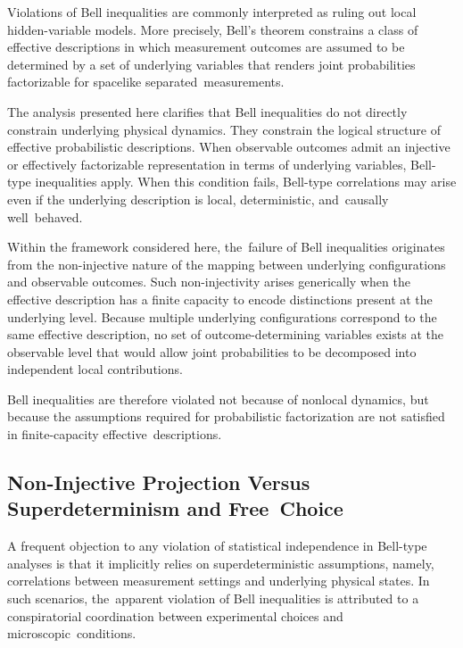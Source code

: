 \documentclass[11pt,a4paper]{article}
\theoremstyle{remark}
\begin{document}
    Violations of Bell inequalities are commonly interpreted as ruling out local
    hidden-variable models.
    More precisely, Bell’s theorem constrains a class of effective descriptions in which
    measurement outcomes are assumed to be determined by a set of underlying variables
    that renders joint probabilities factorizable for spacelike separated~measurements.

    The analysis presented here clarifies that Bell inequalities do not directly constrain
    underlying physical dynamics.
    They constrain the logical structure of effective probabilistic descriptions.
    When observable outcomes admit an injective or effectively factorizable representation
    in terms of underlying variables, Bell-type inequalities apply.
    When this condition fails, Bell-type correlations may arise even if the underlying
    description is local, deterministic, and~causally well~behaved.

    Within the framework considered here, the~failure of Bell inequalities originates
    from the non-injective nature of the mapping between underlying configurations and
    observable outcomes.
    Such non-injectivity arises generically when the effective description has a finite
    capacity to encode distinctions present at the underlying level.
    Because multiple underlying configurations correspond to the same effective
    description, no set of outcome-determining variables exists at the observable level
    that would allow joint probabilities to be decomposed into independent local
    contributions.

    Bell inequalities are therefore violated not because of nonlocal dynamics, but because the assumptions required for probabilistic factorization are not satisfied
    in finite-capacity effective~descriptions.

  \subsection{Non-Injective Projection Versus Superdeterminism and Free~Choice}
    \label{subsec:free-choice}

    A frequent objection to any violation of statistical independence in Bell-type analyses
    is that it implicitly relies on superdeterministic assumptions, namely, correlations
    between measurement settings and underlying physical states.
    In such scenarios, the~apparent violation of Bell inequalities is attributed to a
    conspiratorial coordination between experimental choices and microscopic~conditions.
\end{document}
